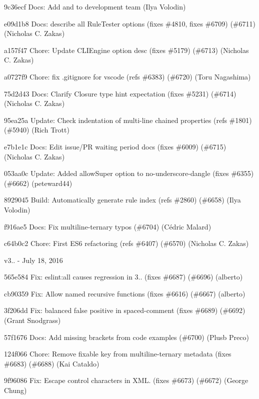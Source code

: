\begin{DoxyItemize}
\item 9c36ecf Docs\+: Add  and  to development team (Ilya Volodin)
\item e09d1b8 Docs\+: describe all Rule\+Tester options (fixes \#4810, fixes \#6709) (\#6711) (Nicholas C. Zakas)
\item a157f47 Chore\+: Update C\+L\+I\+Engine option desc (fixes \#5179) (\#6713) (Nicholas C. Zakas)
\item a0727f9 Chore\+: fix {\ttfamily .gitignore} for vscode (refs \#6383) (\#6720) (Toru Nagashima)
\item 75d2d43 Docs\+: Clarify Closure type hint expectation (fixes \#5231) (\#6714) (Nicholas C. Zakas)
\item 95ea25a Update\+: Check indentation of multi-\/line chained properties (refs \#1801) (\#5940) (Rich Trott)
\item e7b1e1c Docs\+: Edit issue/\+PR waiting period docs (fixes \#6009) (\#6715) (Nicholas C. Zakas)
\item 053aa0c Update\+: Added \textquotesingle{}allow\+Super\textquotesingle{} option to {\ttfamily no-\/underscore-\/dangle} (fixes \#6355) (\#6662) (peteward44)
\item 8929045 Build\+: Automatically generate rule index (refs \#2860) (\#6658) (Ilya Volodin)
\item f916ae5 Docs\+: Fix multiline-\/ternary typos (\#6704) (Cédric Malard)
\item c64b0c2 Chore\+: First E\+S6 refactoring (refs \#6407) (\#6570) (Nicholas C. Zakas)
\end{DoxyItemize}

v3.. -\/ July 18, 2016


\begin{DoxyItemize}
\item 565e584 Fix\+: {\ttfamily eslint\+:all} causes regression in 3.. (fixes \#6687) (\#6696) (alberto)
\item cb90359 Fix\+: Allow named recursive functions (fixes \#6616) (\#6667) (alberto)
\item 3f206dd Fix\+: {\ttfamily balanced} false positive in {\ttfamily spaced-\/comment} (fixes \#6689) (\#6692) (Grant Snodgrass)
\item 57f1676 Docs\+: Add missing brackets from code examples (\#6700) (Plusb Preco)
\item 124f066 Chore\+: Remove fixable key from multiline-\/ternary metadata (fixes \#6683) (\#6688) (Kai Cataldo)
\item 9f96086 Fix\+: Escape control characters in X\+ML. (fixes \#6673) (\#6672) (George Chung)
\end{DoxyItemize}

